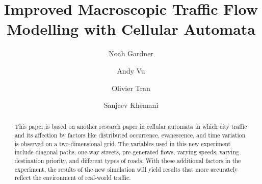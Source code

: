 \documentclass[sigplan,screen]{acmart}
\begin{document}
\title{Improved Macroscopic Traffic Flow Modelling with Cellular Automata}

\author{Noah Gardner}

\author{Andy Vu}
\authornotemark[1]

\author{Olivier Tran}
\authornotemark[1]

\author{Sanjeev Khemani}
\authornotemark[1]

\renewcommand{\shortauthors}{Trovato and Tobin, et al.}

\begin{abstract}
    This paper is based on another research paper in cellular automata in which
    city traffic and its affection by factors like distributed occurrence,
    evanescence, and time variation is observed on a two-dimensional grid. The
    variables used in this new experiment include diagonal paths, one-way streets,
    pre-generated flows, varying speeds, varying destination priority, and
    different types of roads. With these additional factors in the experiment, the
    results of the new simulation will yield results that more accurately reflect
    the environment of real-world traffic.
\end{abstract}
\end{document}
